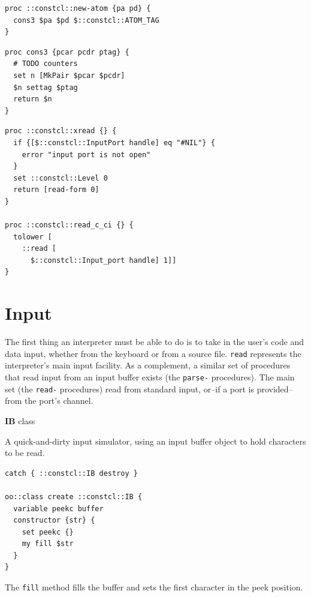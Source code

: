 \documentclass[twoside,9pt]{report}
\begin{document}
\noindent\makebox[\linewidth]{\rule{\linewidth}{0.4pt}}
\begin{lstlisting}
proc ::constcl::new-atom {pa pd} {
  cons3 $pa $pd $::constcl::ATOM_TAG
}
\end{lstlisting}
\noindent\makebox[\linewidth]{\rule{\linewidth}{0.4pt}}
\noindent\makebox[\linewidth]{\rule{\linewidth}{0.4pt}}
\begin{lstlisting}
proc cons3 {pcar pcdr ptag} {
  # TODO counters
  set n [MkPair $pcar $pcdr]
  $n settag $ptag
  return $n
}
\end{lstlisting}
\noindent\makebox[\linewidth]{\rule{\linewidth}{0.4pt}}
\noindent\makebox[\linewidth]{\rule{\linewidth}{0.4pt}}
\begin{lstlisting}
proc ::constcl::xread {} {
  if {[$::constcl::InputPort handle] eq "#NIL"} {
    error "input port is not open"
  }
  set ::constcl::Level 0
  return [read-form 0]
}
 
proc ::constcl::read_c_ci {} {
  tolower [
    ::read [
      $::constcl::Input_port handle] 1]]
}
\end{lstlisting}
\noindent\makebox[\linewidth]{\rule{\linewidth}{0.4pt}}
\chapter{Input}
\label{input}

The first thing an interpreter must be able to do is to take in the user's code and data input, whether from the keyboard or from a source file. \texttt{read} represents the interpreter's main input facility. As a complement, a similar set of procedures that read input from an input buffer exists (the \texttt{parse-} procedures). The main set (the \texttt{read-} procedures) read from standard input, or--if a port is provided--from the port's channel.


\textbf{IB} class


A quick-and-dirty input simulator, using an input buffer object to hold characters to be read.

\noindent\makebox[\linewidth]{\rule{\linewidth}{0.4pt}}
\begin{lstlisting}
catch { ::constcl::IB destroy }
 
oo::class create ::constcl::IB {
  variable peekc buffer
  constructor {str} {
    set peekc {}
    my fill $str
  }
}
\end{lstlisting}
\noindent\makebox[\linewidth]{\rule{\linewidth}{0.4pt}}

The \texttt{fill} method fills the buffer and sets the first character in the peek position.
\end{document}
